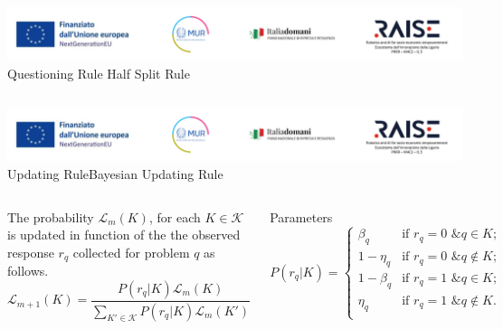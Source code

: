 \documentclass{beamer}
\newcommand{\K}{\mathcal{K}}
\begin{document}
\begin{frame}{\includegraphics[scale=0.4]{Da_cambiare.png} \\ Questioning Rule }{ Half Split Rule}
\begin{columns}
   
    \end{columns}
 
\end{frame}

\begin{frame}{\includegraphics[scale=0.4]{Da_cambiare.png} \\ Updating Rule}{Bayesian Updating Rule} 
  \begin{columns}
\footnotesize
The probability $\mathcal{L}_{m}(K)$, for each $K \in \mathcal{K} $ is updated in function of the {\color{blue} the observed response} $r_q$ collected for problem $q$ as follows. 
\[
\mathcal{L}_{m+1}(K)=\frac{P(r_q|K) \mathcal{L}_{m}(K)}{\sum_{K' \in \K}P(r_q|K) \mathcal{L}_{m}(K')}
\]
\centering
\begin{scriptsize}

    \begin{block}{Parameters}
    \[
       P(r_q|K) = \begin{cases}
		\beta_{q} & \text{if  } r_q=0 \text{ \& } q \in K;\\
		1-\eta_{q} & \text{if  } r_q=0 \text{ \& } q \notin K;\\
		1-\beta_{q} & \text{if  } r_q=1 \text{ \& } q \in K;\\
		\eta_{q} & \text{if  } r_q=1 \text{ \& } q \notin K.\\
	\end{cases}
    \]
\end{block}
\end{scriptsize}


\end{columns}
\end{frame}
\end{document}
